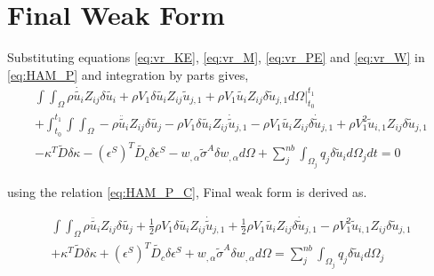 \documentclass[main.tex]{subfiles}
\begin{document}
\section{Final Weak Form}
Substituting equations  \ref{eq:vr_KE}, \ref{eq:vr_M}, \ref{eq:vr_PE} and \ref{eq:vr_W} in \ref{eq:HAM_P} and integration by parts gives,
\begin{equation}
\begin{split}
 \int \int_\Omega 
\rho \dot{\tilde{u_i}} Z_{ij} \delta \tilde{u_i}
+
\rho V_1 \delta {\tilde{u_i}} Z_{ij} \tilde{u}_{j,1} 
+  
\rho V_1 {\tilde{u_i}} Z_{ij} \delta \tilde{u}_{j,1}  
 d \Omega  \Big|_{t_0}^{t_1} 
 \\ +
 \int_{t_0}^{t_1} \int \int_\Omega 
-
\rho \ddot{\tilde{u_i}} Z_{ij} \delta {\tilde{u_j}}
-
\rho V_1 \delta {\tilde{u_i}} Z_{ij} \dot{\tilde{u}}_{j,1} 
-  
\rho V_1  \tilde{u_i} Z_{ij} \delta \dot{\tilde{u}}_{j,1} 
+
\rho V_1^2 \tilde{u}_{i,1} Z_{ij} \delta \tilde{u}_{j,1}
\\ 
- 
\kappa^T \tilde{D} \delta\kappa 
-
\left(\epsilon^S\right)^T \tilde{D_c} \delta\epsilon^S 
- 
 w_{, \alpha} \tilde{\sigma}^A  \delta w_{, \alpha}  d \Omega     
 +   
\sum_j^{nb} \int_{\Omega_j} q_j \delta \tilde{u}_i  d \Omega_j dt = 0
\end{split} 
\end{equation}

using the relation \ref{eq:HAM_P_C}, Final weak form is derived as.

\begin{equation*}
\begin{split}
\int \int_\Omega 
\rho \ddot{\tilde{u_i}} Z_{ij} \delta {\tilde{u_j}}
+  \frac{1}{2}
\rho V_1 \delta {\tilde{u_i}} Z_{ij} \dot{\tilde{u}}_{j,1} 
+ \frac{1}{2}
\rho V_1  \tilde{u_i} Z_{ij} \delta \dot{\tilde{u}}_{j,1} 
-
\rho V_1^2 \tilde{u}_{i,1} Z_{ij} \delta \tilde{u}_{j,1}
\\ 
+ 
\kappa^T \tilde{D} \delta\kappa 
+
\left(\epsilon^S\right)^T \tilde{D_c} \delta\epsilon^S 
+
 w_{, \alpha} \tilde{\sigma}^A  \delta w_{, \alpha}  d \Omega     
 =  
\sum_j^{nb} \int_{\Omega_j} q_j \delta \tilde{u}_i  d \Omega_j 
\end{split} 
\end{equation*}
\end{document}
